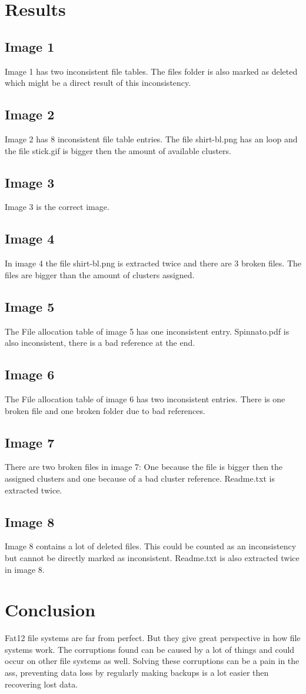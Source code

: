 \documentclass[pdftex,12pt,a4paper]{article}
\begin{document}
\section{Results}
\subsection{Image 1}
Image 1 has two inconsistent file tables. The files folder is also marked as deleted which might be a direct result of this inconsistency. 
\subsection{Image 2}
Image 2 has 8 inconsistent file table entries. The file shirt-bl.png has an loop and the file stick.gif is bigger then the amount of available clusters.
\subsection{Image 3}
Image 3 is the correct image. 
\subsection{Image 4}
In image 4 the file shirt-bl.png is extracted twice and there are 3 broken files. The files are bigger than the amount of clusters assigned. 
\subsection{Image 5}
The File allocation table of image 5 has one inconsistent entry.
Spinnato.pdf is also inconsistent, there is a bad reference at the end.
\subsection{Image 6}
The File allocation table of image 6 has two inconsistent entries. There is one broken file and one broken folder due to bad references.
\subsection{Image 7}
There are two broken files in image 7: One because the file is bigger then the assigned clusters and one because of a bad cluster reference. Readme.txt is extracted twice.
\subsection{Image 8}
Image 8 contains a lot of deleted files. This could be counted as an inconsistency but cannot be directly marked as inconsistent. Readme.txt is also extracted twice in image 8. 

\section{Conclusion}
Fat12 file systems are far from perfect. But they give great perspective in how file systems work. The corruptions found can be caused by a lot of things and could occur on other file systems as well. Solving these corruptions can be a pain in the ass, preventing data loss by regularly making backups is a lot easier then recovering lost data. 
\end{document}
